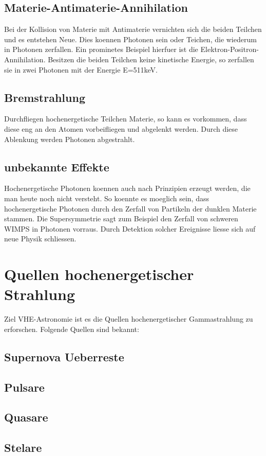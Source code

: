 \subsection{Materie-Antimaterie-Annihilation}
Bei der Kollision von Materie mit Antimaterie vernichten sich die beiden Teilchen und es entstehen Neue. Dies koennen Photonen sein oder Teichen, die wiederum in Photonen zerfallen. Ein prominetes Beispiel hierfuer ist die Elektron-Positron-Annihilation. Besitzen die beiden Teilchen keine kinetische Energie, so zerfallen sie in zwei Photonen mit der Energie E=511keV.
\subsection{Bremstrahlung}
Durchfliegen hochenergetische Teilchen Materie, so kann es vorkommen, dass diese eng an den Atomen vorbeifliegen und abgelenkt werden. Durch diese Ablenkung werden Photonen abgestrahlt.
\subsection{unbekannte Effekte}
Hochenergetische Photonen koennen auch nach Prinzipien erzeugt werden, die man heute noch nicht versteht. So koennte es moeglich sein, dass hochenergetische Photonen durch den Zerfall von Partikeln der dunklen Materie stammen. Die Supersymmetrie sagt zum Beispiel den Zerfall von schweren WIMPS in Photonen vorraus. Durch Detektion solcher Ereignisse liesse sich auf neue Physik schliessen.

\section{Quellen hochenergetischer Strahlung}
Ziel VHE-Astronomie ist es die Quellen hochenergetischer Gammastrahlung zu erforschen. Folgende Quellen sind bekannt:
\subsection{Supernova Ueberreste}
\subsection{Pulsare}
\subsection{Quasare}
\subsection{Stelare}
